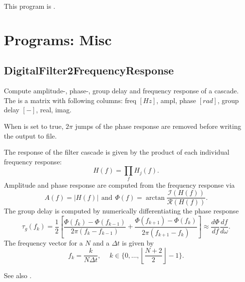 This program is .
\clearpage
\section{Programs: Misc}
\subsection{DigitalFilter2FrequencyResponse}\label{DigitalFilter2FrequencyResponse}
Compute amplitude-, phase-, group delay and frequency response of a  cascade.
The  is a matrix with following columns:
freq $[Hz]$, ampl, phase $[rad]$, group delay $[-]$, real, imag.

When  is set to true, $2\pi$ jumps of the phase response are removed before writing the output to file.

The response of the filter cascade is given by the product of each individual frequency response:
\begin{equation}
  H(f) = \prod_f H_j(f).
\end{equation}
Amplitude and phase response are computed from the frequency response via
\begin{equation}
  A(f) = |H(f)| \hspace{5pt}\text{and}\hspace{5pt} \Phi(f) = \arctan \frac{\mathcal{I}(H(f))}{\mathcal{R}(H(f))}.
\end{equation}
The group delay is computed by numerically differentiating the phase response
\begin{equation}
  \tau_g(f_k) = \frac{1}{2} \left[\frac{\Phi(f_k) - \Phi(f_{k-1})}{2\pi(f_k-f_{k-1})} + \frac{\Phi(f_{k+1}) - \Phi(f_{k})}{2\pi(f_{k+1}-f_{k})}\right] \approx \frac{d\Phi}{df}\frac{df}{d\omega}.
\end{equation}
The frequency vector for a  $N$ and a  $\Delta t$ is given by
\begin{equation}
  f_k = \frac{k}{N \Delta t}, \hspace{15pt} k \in \{0, \dots, \left\lfloor\frac{N+2}{2}\right\rfloor-1\}.
\end{equation}

See also .


